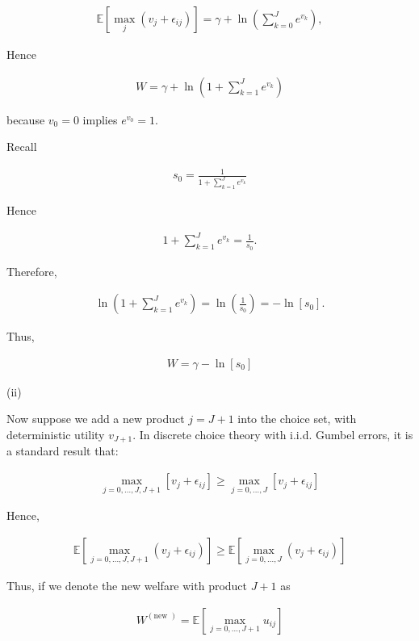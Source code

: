 \begin{align*}
\mathbb{E}\left[\max _j\left(v_j+\epsilon_{i j}\right)\right]=\gamma+\ln \left(\sum_{k=0}^J e^{v_k}\right),
\end{align*}

Hence

\begin{align*}
W=\gamma+\ln \left(1+\sum_{k=1}^J e^{v_k}\right)
\end{align*}

because $v_0=0$ implies $e^{v_0}=1$.


Recall

\begin{align*}
s_0=\frac{1}{1+\sum_{k=1}^J e^{v_k}}
\end{align*}


Hence

\begin{align*}
1+\sum_{k=1}^J e^{v_k}=\frac{1}{s_0} .
\end{align*}


Therefore,

\begin{align*}
\ln \left(1+\sum_{k=1}^J e^{v_k}\right)=\ln \left(\frac{1}{s_0}\right)=-\ln \left[s_0\right] .
\end{align*}


Thus,

\begin{align*}
W=\gamma-\ln \left[s_0\right]
\end{align*}

(ii)

Now suppose we add a new product $j=J+1$ into the choice set, with deterministic utility $v_{J+1}$. In discrete choice theory with i.i.d. Gumbel errors, it is a standard result that:

\begin{align*}
\max _{j=0, \ldots, J, J+1}\left[v_j+\epsilon_{i j}\right] \geq \max _{j=0, \ldots, J}\left[v_j+\epsilon_{i j}\right]
\end{align*}


Hence,

\begin{align*}
\mathbb{E}\left[\max _{j=0, \ldots, J, J+1}\left(v_j+\epsilon_{i j}\right)\right] \geq \mathbb{E}\left[\max _{j=0, \ldots, J}\left(v_j+\epsilon_{i j}\right)\right]
\end{align*}


Thus, if we denote the new welfare with product $J+1$ as

\begin{align*}
W^{(\text {new })}=\mathbb{E}\left[\max _{j=0, \ldots, J+1} u_{i j}\right]
\end{align*}

